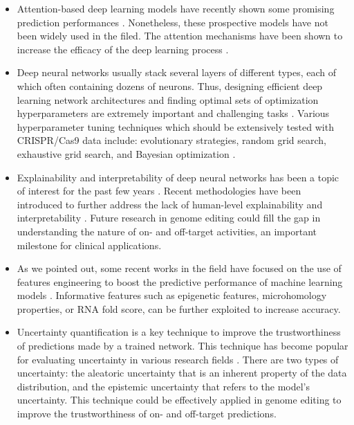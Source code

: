 \documentclass[unnumsec,webpdf,contemporary,large]{oup-authoring-template}
\theoremstyle{thmstyleone}%
\theoremstyle{thmstyletwo}%
\theoremstyle{thmstylethree}%
\begin{document}
\begin{itemize}
\item Attention-based deep learning models have recently shown some promising prediction performances \cite{zhang2021prediction, xiao2021attcrispr, vaswani2017attention}. Nonetheless, these prospective models have not been widely used in the filed. The attention mechanisms have been shown to increase the efficacy of the deep learning process \cite{chen2022gcsanet, shen2022attention, de2022attention, basiri2021abcdm}.

\item Deep neural networks usually stack several layers of different types, each of which often containing dozens of neurons. Thus, designing efficient deep learning network architectures and finding optimal sets of optimization hyperparameters are extremely important and challenging tasks \cite{cho2020basic, wu2020practical}. Various hyperparameter tuning techniques which should be extensively tested with CRISPR/Cas9 data include: evolutionary strategies, random grid search, exhaustive grid search, and Bayesian optimization \cite{heaton2018ian}.

\item Explainability and interpretability of deep neural networks has been a topic of interest for the past few years \citep{heaton2018ian,ribeiro2016should}. Recent methodologies have been introduced to further address the lack of human-level explainability and interpretability \cite{miller2019explanation, chou2022counterfactuals, vilone2021notions}. Future research in genome editing could fill the gap in understanding the nature of on- and off-target activities, an important milestone for clinical applications.

\item As we pointed out, some recent works in the field have focused on the use of features engineering to boost the predictive performance of machine learning models \cite{wang2019optimized, shrawgi2019convolution}. Informative features such as epigenetic features, microhomology properties, or RNA fold score, can be further exploited to increase accuracy.

\item Uncertainty quantification is a key technique to improve the trustworthiness of predictions made by a trained network. This technique has become popular for evaluating uncertainty in various research fields \cite{abdar2021review, abdar2021uncertainty, abdar2023uncertaintyfusenet, hoffmann2021uncertainty, mazoure2022dunescan}. There are two types of uncertainty: the aleatoric uncertainty that is an inherent property of the data distribution, and the epistemic uncertainty that refers to the model's uncertainty. This technique could be effectively applied in genome editing to improve the trustworthiness of on- and off-target predictions.


\end{itemize}
\end{document}
